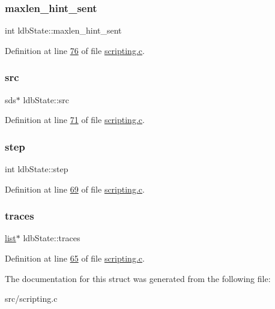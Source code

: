 \subsubsection{\texorpdfstring{maxlen\+\_\+hint\+\_\+sent}{maxlen\_hint\_sent}}
{\footnotesize\ttfamily int ldb\+State\+::maxlen\+\_\+hint\+\_\+sent}



Definition at line \hyperlink{scripting_8c_source_l00076}{76} of file \hyperlink{scripting_8c_source}{scripting.\+c}.

\mbox{\label{structldbState_a2d752e55a6005c1668afc18e63157dfa}} 
\subsubsection{\texorpdfstring{src}{src}}
{\footnotesize\ttfamily sds$\ast$ ldb\+State\+::src}



Definition at line \hyperlink{scripting_8c_source_l00071}{71} of file \hyperlink{scripting_8c_source}{scripting.\+c}.

\mbox{\label{structldbState_ad057b073b09629cb6ebc327974f561ed}} 
\subsubsection{\texorpdfstring{step}{step}}
{\footnotesize\ttfamily int ldb\+State\+::step}



Definition at line \hyperlink{scripting_8c_source_l00069}{69} of file \hyperlink{scripting_8c_source}{scripting.\+c}.

\mbox{\label{structldbState_aab7c5fd73a0e8d3c1d145b17e93136fc}} 
\subsubsection{\texorpdfstring{traces}{traces}}
{\footnotesize\ttfamily \hyperlink{structlist}{list}$\ast$ ldb\+State\+::traces}



Definition at line \hyperlink{scripting_8c_source_l00065}{65} of file \hyperlink{scripting_8c_source}{scripting.\+c}.



The documentation for this struct was generated from the following file\+:\begin{DoxyCompactItemize}
\item 
src/scripting.\+c\end{DoxyCompactItemize}
